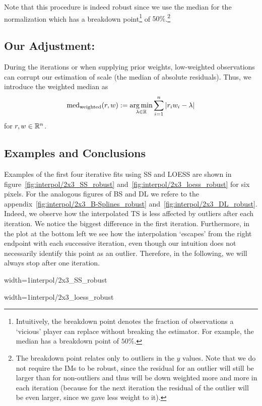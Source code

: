 {	Note that this procedure is indeed robust since we use the median for the normalization which has a breakdown point\footnote{Intuitively, the breakdown point denotes the fraction of observations a `vicious' player can replace without breaking the estimator. For example, the median has a breakdown point of $50 \%$.} of $50 \%$.\footnote{The breakdown point relates only to outliers in the $y$ values. Note that we do not require the {{IM}}s to be robust, since the residual for an outlier will  still be larger than for non-outliers and thus will be down weighted more and more in each iteration (because for the next iteration the residual of the outlier will be even larger, since we gave less weight to it).}
	\subsection{Our Adjustment:}{
		During the iterations or when supplying prior weights, low-weighted observations can corrupt our estimation of scale (the median of absolute residuals). Thus, we introduce the weighted median as
		$$
			\operatorname{med}_\text{weighted}(r,w) := \operatorname*{arg\, min}_{\lambda \in \mathbb{R}} \sum_{i=1}^n |r_iw_i -\lambda|
		$$
		for $r,w\in \mathbb{R}^n$. 
	}
	\subsection{Examples and Conclusions}{		
		Examples of the first four iterative fits using SS and LOESS are shown in figure~\ref{fig:interpol/2x3_SS_robust} and~\ref{fig:interpol/2x3_loess_robust} for six pixels. For the analogous figures of BS and DL we refere to the appendix~\ref{fig:interpol/2x3_B-Splines_robust} and~\ref{fig:interpol/2x3_DL_robust}.
		Indeed, we observe how the interpolated {TS} is less affected by outliers after each iteration. We notice the biggest difference in the first iteration. Furthermore, in the plot at the bottom left we see how the interpolation `escapes' from the right endpoint with each successive iteration, even though our intuition does not necessarily identify this point as an outlier. Therefore, in the following, we will always stop after one iteration.

		\begin{my_figure}[h]{width=1\textwidth}{interpol/2x3_SS_robust}
			\caption[Smoothing splines robustification.]{Smoothing splines \RobItPlot}
			\label{fig:interpol/2x3_SS_robust}
		\end{my_figure}
		\begin{my_figure}[h]{width=1\textwidth}{interpol/2x3_loess_robust}
			\caption[The LOESS smoother robustification.]{The LOESS smoother \RobItPlot}
			\label{fig:interpol/2x3_loess_robust}
		\end{my_figure}
	} 
	
}
